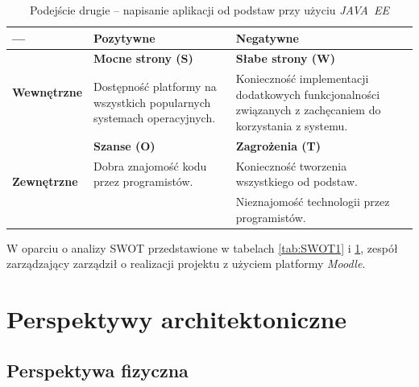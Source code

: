 \begin{table}[H]
\centering
\begin{tabular}{ | p{2.5cm} | p{5.5cm} | p{5.5cm} | }
\hline
--- & \textbf{Pozytywne} & \textbf{Negatywne} \\ \hline
\multirow{2}{*}{\textbf{Wewnętrzne}} & \textbf{Mocne strony (S)} & \textbf{Słabe strony (W)} \\
			& Dostępność platformy na wszystkich popularnych systemach operacyjnych. & Konieczność implementacji dodatkowych funkcjonalności związanych z zachęcaniem do korzystania z systemu. \\ \hline
%					
\multirow{3}{*}{\textbf{Zewnętrzne}} & \textbf{Szanse (O)} & \textbf{Zagrożenia (T)} \\
				& Dobra znajomość kodu przez programistów. & Konieczność tworzenia wszystkiego od podstaw. \\
				& & Nieznajomość technologii przez programistów. \\ \hline
\end{tabular}
\caption{Podejście drugie -- napisanie aplikacji od podstaw przy użyciu \textit{JAVA~EE}}\label{tab:SWOT2}
\end{table}

W oparciu o analizy SWOT przedstawione w tabelach \ref{tab:SWOT1} i \ref{tab:SWOT2}, zespół zarządzający zarządził o realizacji projektu z użyciem platformy \textit{Moodle}.

\section{Perspektywy architektoniczne}
\label{Chapter54}

\subsection{Perspektywa fizyczna}
\label{Chapter541}


